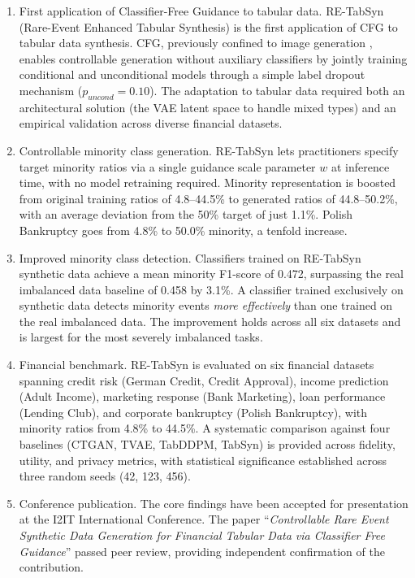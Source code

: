\begin{enumerate}
    \item First application of Classifier-Free Guidance to tabular data. RE-TabSyn (Rare-Event Enhanced Tabular Synthesis) is the first application of CFG to tabular data synthesis. CFG, previously confined to image generation \cite{ho2022cfg}, enables controllable generation without auxiliary classifiers by jointly training conditional and unconditional models through a simple label dropout mechanism ($p_{uncond} = 0.10$). The adaptation to tabular data required both an architectural solution (the VAE latent space to handle mixed types) and an empirical validation across diverse financial datasets.

    \item Controllable minority class generation. RE-TabSyn lets practitioners specify target minority ratios via a single guidance scale parameter $w$ at inference time, with no model retraining required. Minority representation is boosted from original training ratios of 4.8--44.5\% to generated ratios of 44.8--50.2\%, with an average deviation from the 50\% target of just 1.1\%. Polish Bankruptcy goes from 4.8\% to 50.0\% minority, a tenfold increase.

    \item Improved minority class detection. Classifiers trained on RE-TabSyn synthetic data achieve a mean minority F1-score of 0.472, surpassing the real imbalanced data baseline of 0.458 by 3.1\%. A classifier trained exclusively on synthetic data detects minority events \textit{more effectively} than one trained on the real imbalanced data. The improvement holds across all six datasets and is largest for the most severely imbalanced tasks.

    \item Financial benchmark. RE-TabSyn is evaluated on six financial datasets spanning credit risk (German Credit, Credit Approval), income prediction (Adult Income), marketing response (Bank Marketing), loan performance (Lending Club), and corporate bankruptcy (Polish Bankruptcy), with minority ratios from 4.8\% to 44.5\%. A systematic comparison against four baselines (CTGAN, TVAE, TabDDPM, TabSyn) is provided across fidelity, utility, and privacy metrics, with statistical significance established across three random seeds (42, 123, 456).

    \item Conference publication. The core findings have been accepted for presentation at the I2IT International Conference. The paper ``\textit{Controllable Rare Event Synthetic Data Generation for Financial Tabular Data via Classifier Free Guidance}'' passed peer review, providing independent confirmation of the contribution.
\end{enumerate}

